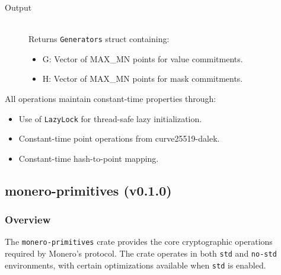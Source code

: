 \begin{description}
\item[Output] \hfill \\
Returns \texttt{Generators} struct containing: %
\begin{itemize}
\item G: Vector of MAX\_MN points for value commitments.  %
\item H: Vector of MAX\_MN points for mask commitments.  %
\end{itemize}
\end{description}

All operations maintain constant-time properties through:
\begin{itemize}
\item Use of \texttt{LazyLock} for thread-safe lazy initialization.  %
\item Constant-time point operations from curve25519-dalek.  %
\item Constant-time hash-to-point mapping.  %
\end{itemize}


\subsection{monero-primitives (v0.1.0)}

\subsubsection{Overview}
The \texttt{monero-primitives} crate provides the core cryptographic operations required by Monero's protocol.  The crate operates in both \texttt{std} and \texttt{no-std} environments, with certain optimizations available when \texttt{std} is enabled.


